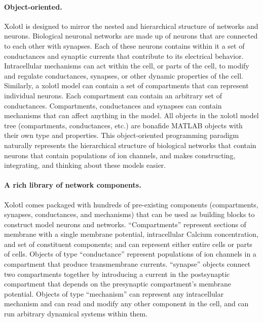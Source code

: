 \documentclass{frontiersSCNS} %
\begin{document}
\paragraph{Object-oriented.}
Xolotl is designed to mirror the nested and hierarchical structure of networks and neurons. Biological neuronal networks are made up of neurons that are connected to each other with synapses. Each of these neurons contains within it a set of conductances and synaptic currents that contribute to its electrical behavior. Intracellular mechanisms can act within the cell, or parts of the cell, to modify and regulate conductances, synapses, or other dynamic properties of the cell. Similarly, a xolotl model can contain a set of compartments that can represent individual neurons. Each compartment can contain an arbitrary set of conductances. Compartments, conductances and synapses can contain mechanisms that can affect anything in the model. All objects in the xolotl model tree (compartments, conductances, etc.) are bonafide MATLAB objects with their own type and properties. This object-oriented programming paradigm naturally represents the hierarchical structure of biological networks that contain neurons that contain populations of ion channels, and makes constructing, integrating, and thinking about these models easier.


\paragraph{A rich library of network components.} Xolotl comes packaged with hundreds of pre-existing components (compartments, synapses, conductances, and mechanisms) that can be used as building blocks to construct model neurons and networks. ``Compartments'' represent sections of membrane with a single membrane potential, intracellular Calcium concentration, and set of constituent components; and can represent either entire cells or parts of cells. Objects of type ``conductance'' represent populations of ion channels in a compartment that produce transmembrane currents. ``synapse'' objects connect two compartments together by introducing a current in the postsynaptic compartment that depends on the presynaptic compartment's membrane potential. Objects of type ``mechanism'' can represent any intracellular mechanism and can read and modify any other component in the cell, and can run arbitrary dynamical systems within them.
\end{document}
